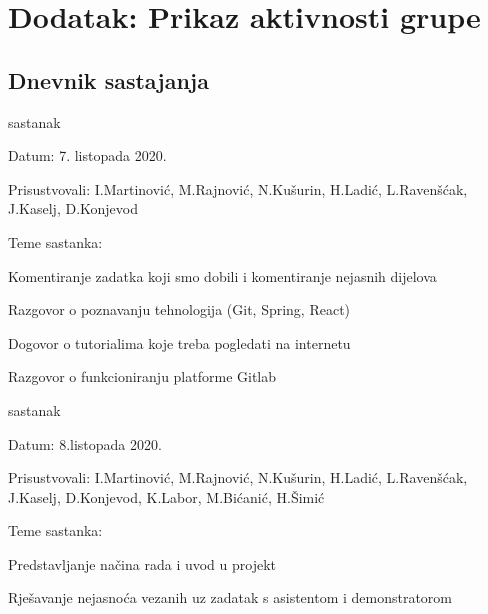 \chapter*{Dodatak: Prikaz aktivnosti grupe}
		
		\section*{Dnevnik sastajanja}
		
		\begin{packed_enum}
			\item  sastanak
			
			\item[] \begin{packed_item}
				\item Datum:  7. listopada 2020.
				\item Prisustvovali: I.Martinović, M.Rajnović, N.Kušurin, H.Ladić, L.Ravenšćak, J.Kaselj, D.Konjevod
				\item Teme sastanka: 
				\begin{packed_item}
					\item  Komentiranje zadatka koji smo dobili i komentiranje nejasnih dijelova
					\item  Razgovor o poznavanju tehnologija (Git, Spring, React)
					\item  Dogovor o tutorialima koje treba pogledati na internetu
					\item  Razgovor o funkcioniranju platforme Gitlab
				\end{packed_item}
			\end{packed_item}
			
			\item  sastanak
			\item[] \begin{packed_item}
				\item Datum:  8.listopada 2020.
				\item Prisustvovali: I.Martinović, M.Rajnović, N.Kušurin, H.Ladić, L.Ravenšćak, J.Kaselj, D.Konjevod, K.Labor, M.Bićanić, H.Šimić
				\item Teme sastanka:
				\begin{packed_item}
					\item   Predstavljanje načina rada i uvod u projekt
					\item   Rješavanje nejasnoća vezanih uz zadatak s asistentom i demonstratorom
				\end{packed_item}
			\end{packed_item}
		

\end{packed_enum}

